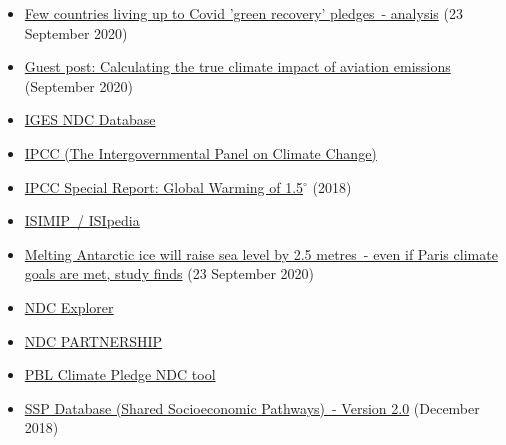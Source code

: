 \documentclass[12pt]{article}
\begin{document}
\begin{itemize}
 \vspace{-.2cm} \item \href{https://www.theguardian.com/environment/2020/sep/23/few-countries-living-up-to-green-recovery-promises-analysis?utm_campaign=Carbon%20Brief%20Daily%20Briefing&utm_medium=email&utm_source=Revue%20newsletter}{Few countries living up to Covid 'green recovery' pledges~- analysis} (23 September 2020)
 \vspace{-.2cm} \item \href{https://www.carbonbrief.org/guest-post-calculating-the-true-climate-impact-of-aviation-emissions?utm_campaign=Carbon%20Brief%20Daily%20Briefing&utm_medium=email&utm_source=Revue%20newsletter}{Guest post: Calculating the true climate impact of aviation emissions} (September 2020)
 \vspace{-.2cm} \item \href{https://www.iges.or.jp/en/pub/iges-indc-ndc-database/en}{IGES NDC Database} 
 \vspace{-.2cm} \item \href{https://www.ipcc.ch/}{IPCC (The Intergovernmental Panel on Climate Change)} 
 \vspace{-.2cm} \item \href{https://www.ipcc.ch/sr15/}{IPCC Special Report: Global Warming of 1.5$^{\circ}$} (2018)
 \vspace{-.2cm} \item \href{https://www.isimip.org/isipedia/#isipedia-portal}{ISIMIP~/ ISIpedia} 
 \vspace{-.2cm} \item \href{https://www.theguardian.com/environment/2020/sep/23/melting-antarctic-ice-will-raise-sea-level-by-25-metres-even-if-paris-climate-goals-are-met-study-finds?CMP=share_btn_tw&utm_campaign=Carbon%20Brief%20Daily%20Briefing&utm_medium=email&utm_source=Revue%20newsletter}{Melting Antarctic ice will raise sea level by 2.5 metres~- even if Paris climate goals are met, study finds} (23 September 2020)
 \vspace{-.2cm} \item \href{https://klimalog.die-gdi.de/ndc/#NDCExplorer/worldMap?NDC??income???catIncome}{NDC Explorer} 
 \vspace{-.2cm} \item \href{https://ndcpartnership.org/}{NDC PARTNERSHIP} 
 \vspace{-.2cm} \item \href{https://themasites.pbl.nl/o/climate-ndc-policies-tool/}{PBL Climate Pledge NDC tool} 
 \vspace{-.2cm} \item \href{https://tntcat.iiasa.ac.at/SspDb/dsd?Action=htmlpage&page=about}{SSP Database (Shared Socioeconomic Pathways)~- Version 2.0} (December 2018)

\end{itemize}
\end{document}
